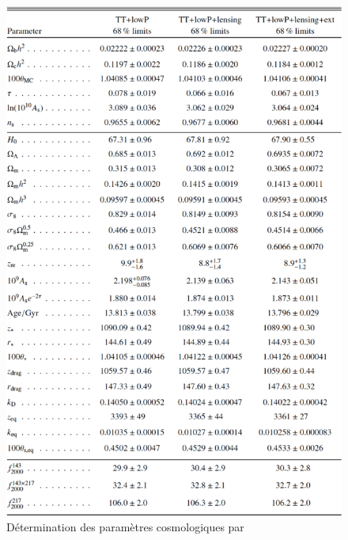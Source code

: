 

\begin{figure}
        \includegraphics[width=.95\linewidth]{img/01/table_planck2.pdf} 
        \caption[Tables paramètres cosmologique]{Détermination des paramètres cosmologiques par \cite{planck_collaboration_planck_2016} }
 		\label{fig:planck_parameters}
\end{figure}
%
%
%
